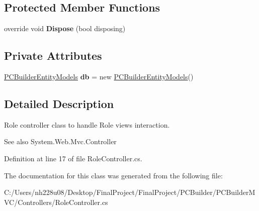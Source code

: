 \subsection*{Protected Member Functions}
\begin{DoxyCompactItemize}
\item 
override void {\bfseries Dispose} (bool disposing)\hypertarget{class_p_c_builder_m_v_c_1_1_controllers_1_1_role_controller_a6c4e2e6ec3e29a8c899cd71da1450150}{}\label{class_p_c_builder_m_v_c_1_1_controllers_1_1_role_controller_a6c4e2e6ec3e29a8c899cd71da1450150}

\end{DoxyCompactItemize}
\subsection*{Private Attributes}
\begin{DoxyCompactItemize}
\item 
\hyperlink{class_p_c_builder_m_v_c_1_1_models_1_1_p_c_builder_entity_models}{P\+C\+Builder\+Entity\+Models} {\bfseries db} = new \hyperlink{class_p_c_builder_m_v_c_1_1_models_1_1_p_c_builder_entity_models}{P\+C\+Builder\+Entity\+Models}()\hypertarget{class_p_c_builder_m_v_c_1_1_controllers_1_1_role_controller_a80a5f7cc23a5d4f5b44003861bc251c0}{}\label{class_p_c_builder_m_v_c_1_1_controllers_1_1_role_controller_a80a5f7cc23a5d4f5b44003861bc251c0}

\end{DoxyCompactItemize}


\subsection{Detailed Description}
Role controller class to handle Role views interaction. 

\begin{DoxySeeAlso}{See also}
System.\+Web.\+Mvc.\+Controller


\end{DoxySeeAlso}


Definition at line 17 of file Role\+Controller.\+cs.



The documentation for this class was generated from the following file\+:\begin{DoxyCompactItemize}
\item 
C\+:/\+Users/nh228u08/\+Desktop/\+Final\+Project/\+Final\+Project/\+P\+C\+Builder/\+P\+C\+Builder\+M\+V\+C/\+Controllers/Role\+Controller.\+cs\end{DoxyCompactItemize}
